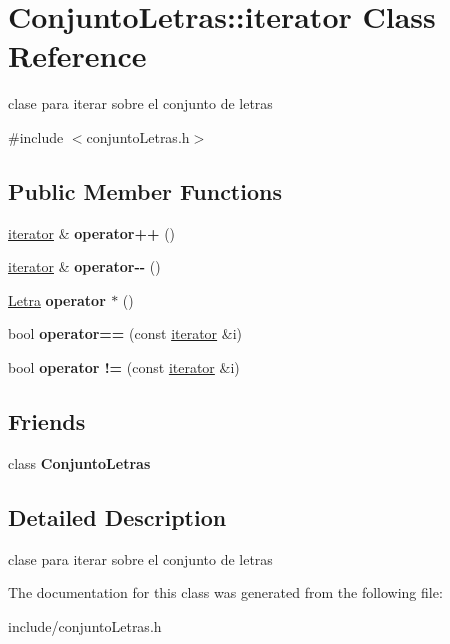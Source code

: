\hypertarget{classConjuntoLetras_1_1iterator}{}\section{Conjunto\+Letras\+::iterator Class Reference}
\label{classConjuntoLetras_1_1iterator}


clase para iterar sobre el conjunto de letras  




{\ttfamily \#include $<$conjunto\+Letras.\+h$>$}

\subsection*{Public Member Functions}
\begin{DoxyCompactItemize}
\item 
\mbox{\label{classConjuntoLetras_1_1iterator_a0609a45e191b409baf1b9cd62f1177d7}} 
\mbox{\hyperlink{classConjuntoLetras_1_1iterator}{iterator}} \& {\bfseries operator++} ()
\item 
\mbox{\label{classConjuntoLetras_1_1iterator_abc09c368919aebc20672d5c3bfc6944a}} 
\mbox{\hyperlink{classConjuntoLetras_1_1iterator}{iterator}} \& {\bfseries operator-\/-\/} ()
\item 
\mbox{\label{classConjuntoLetras_1_1iterator_a2180293a86b7f16a7b2886efd3b85fc6}} 
\mbox{\hyperlink{classLetra}{Letra}} {\bfseries operator $\ast$} ()
\item 
\mbox{\label{classConjuntoLetras_1_1iterator_ade8c40ae685af26f3797fd3ee08d0d1a}} 
bool {\bfseries operator==} (const \mbox{\hyperlink{classConjuntoLetras_1_1iterator}{iterator}} \&i)
\item 
\mbox{\label{classConjuntoLetras_1_1iterator_a12808b4c4b6fe88f7e49faa9aa58f347}} 
bool {\bfseries operator !=} (const \mbox{\hyperlink{classConjuntoLetras_1_1iterator}{iterator}} \&i)
\end{DoxyCompactItemize}
\subsection*{Friends}
\begin{DoxyCompactItemize}
\item 
\mbox{\label{classConjuntoLetras_1_1iterator_ad71096262c5cea54824d94ed4bfa43e8}} 
class {\bfseries Conjunto\+Letras}
\end{DoxyCompactItemize}


\subsection{Detailed Description}
clase para iterar sobre el conjunto de letras 

The documentation for this class was generated from the following file\+:\begin{DoxyCompactItemize}
\item 
include/conjunto\+Letras.\+h\end{DoxyCompactItemize}
